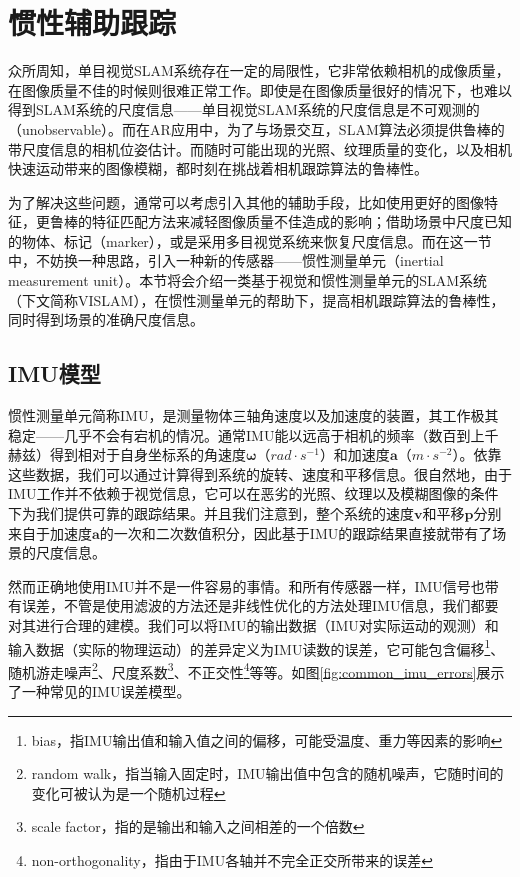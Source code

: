 \section{惯性辅助跟踪}

众所周知，单目视觉SLAM系统存在一定的局限性，它非常依赖相机的成像质量，在图像质量不佳的时候则很难正常工作。即使是在图像质量很好的情况下，也难以得到SLAM系统的尺度信息——单目视觉SLAM系统的尺度信息是不可观测的（unobservable）。而在AR应用中，为了与场景交互，SLAM算法必须提供鲁棒的带尺度信息的相机位姿估计。而随时可能出现的光照、纹理质量的变化，以及相机快速运动带来的图像模糊，都时刻在挑战着相机跟踪算法的鲁棒性。

为了解决这些问题，通常可以考虑引入其他的辅助手段，比如使用更好的图像特征，更鲁棒的特征匹配方法来减轻图像质量不佳造成的影响；借助场景中尺度已知的物体、标记（marker），或是采用多目视觉系统来恢复尺度信息。而在这一节中，不妨换一种思路，引入一种新的传感器——惯性测量单元（inertial measurement unit）。本节将会介绍一类基于视觉和惯性测量单元的SLAM系统（下文简称VISLAM），在惯性测量单元的帮助下，提高相机跟踪算法的鲁棒性，同时得到场景的准确尺度信息。

\subsection{IMU模型}

惯性测量单元简称IMU，是测量物体三轴角速度以及加速度的装置，其工作极其稳定——几乎不会有宕机的情况。通常IMU能以远高于相机的频率（数百到上千赫兹）得到相对于自身坐标系的角速度$\bm\omega$（$rad \cdot s^{-1}$）和加速度$\mathbf{a}$（$m \cdot s^{-2}$）。依靠这些数据，我们可以通过计算得到系统的旋转、速度和平移信息。很自然地，由于IMU工作并不依赖于视觉信息，它可以在恶劣的光照、纹理以及模糊图像的条件下为我们提供可靠的跟踪结果。并且我们注意到，整个系统的速度$\mathbf{v}$和平移$\mathbf{p}$分别来自于加速度$\mathbf{a}$的一次和二次数值积分，因此基于IMU的跟踪结果直接就带有了场景的尺度信息。

然而正确地使用IMU并不是一件容易的事情。和所有传感器一样，IMU信号也带有误差，不管是使用滤波的方法还是非线性优化的方法处理IMU信息，我们都要对其进行合理的建模。我们可以将IMU的输出数据（IMU对实际运动的观测）和输入数据（实际的物理运动）的差异定义为IMU读数的误差，它可能包含偏移\footnote{bias，指IMU输出值和输入值之间的偏移，可能受温度、重力等因素的影响}、随机游走噪声\footnote{random walk，指当输入固定时，IMU输出值中包含的随机噪声，它随时间的变化可被认为是一个随机过程}、尺度系数\footnote{scale factor，指的是输出和输入之间相差的一个倍数}、不正交性\footnote{non-orthogonality，指由于IMU各轴并不完全正交所带来的误差}等等\citep{imu2014}。如图\ref{fig:common_imu_errors}展示了一种常见的IMU误差模型。

